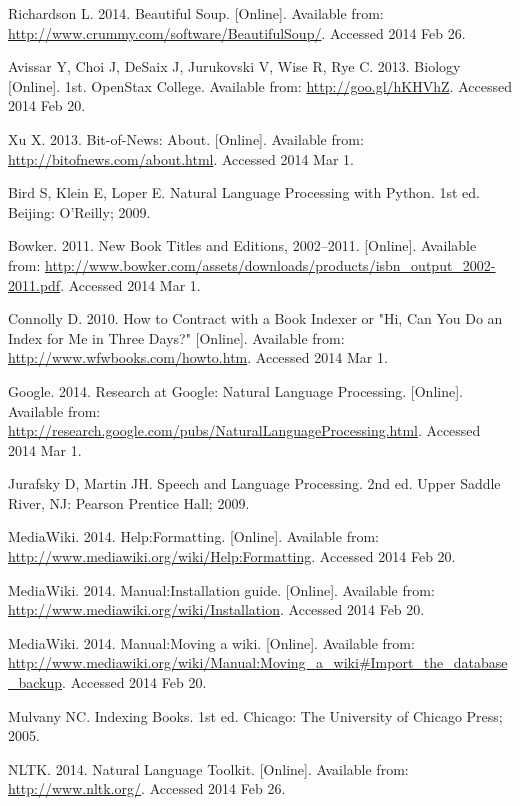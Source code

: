 \begin{thebibliography}{99}

Richardson L. 2014. Beautiful Soup. [Online]. Available from: \url{http://www.crummy.com/software/BeautifulSoup/}. Accessed 2014 Feb 26.

Avissar Y, Choi J, DeSaix J, Jurukovski V, Wise R, Rye C. 2013. Biology [Online]. 1st. OpenStax College. Available from: \url{http://goo.gl/hKHVhZ}. Accessed 2014 Feb 20.

Xu X. 2013. Bit-of-News: About. [Online]. Available from: \url{http://bitofnews.com/about.html}. Accessed 2014 Mar 1.

Bird S, Klein E, Loper E. Natural Language Processing with Python. 1st ed. Beijing: O'Reilly; 2009.

Bowker. 2011. New Book Titles and Editions, 2002--2011. [Online]. Available from: \url{http://www.bowker.com/assets/downloads/products/isbn_output_2002-2011.pdf}. Accessed 2014 Mar 1.

Connolly D. 2010. How to Contract with a Book Indexer or "Hi, Can You Do an Index for Me in Three Days?" [Online]. Available from: \url{http://www.wfwbooks.com/howto.htm}. Accessed 2014 Mar 1.

Google. 2014. Research at Google: Natural Language Processing. [Online]. Available from: \url{http://research.google.com/pubs/NaturalLanguageProcessing.html}. Accessed 2014 Mar 1.

Jurafsky D, Martin JH. Speech and Language Processing. 2nd ed. Upper Saddle River, NJ: Pearson Prentice Hall; 2009.

MediaWiki. 2014. Help:Formatting. [Online]. Available from: \url{http://www.mediawiki.org/wiki/Help:Formatting}. Accessed 2014 Feb 20.

MediaWiki. 2014. Manual:Installation guide. [Online]. Available from: \url{http://www.mediawiki.org/wiki/Installation}. Accessed 2014 Feb 20.

MediaWiki. 2014. Manual:Moving a wiki. [Online]. Available from: \url{http://www.mediawiki.org/wiki/Manual:Moving_a_wiki#Import_the_database_backup}. Accessed 2014 Feb 20.

Mulvany NC. Indexing Books. 1st ed. Chicago: The University of Chicago Press; 2005.

NLTK. 2014. Natural Language Toolkit. [Online]. Available from: \url{http://www.nltk.org/}. Accessed 2014 Feb 26.


\end{thebibliography}
